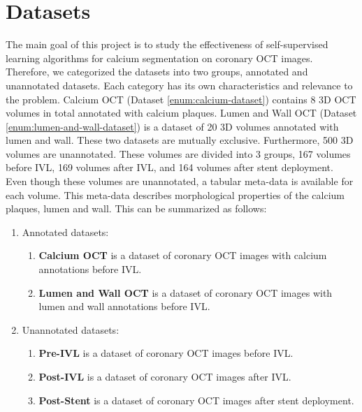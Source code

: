\documentclass[a4paper,11pt,oneside]{report}
\begin{document}

\section{Datasets}\label{sec:design:datasets}
The main goal of this project is to study the effectiveness of self-supervised learning algorithms for calcium segmentation on coronary OCT images. Therefore, we categorized the datasets into two groups, annotated and unannotated datasets. Each category has its own characteristics and relevance to the problem. Calcium OCT (Dataset \ref{enum:calcium-dataset}) contains 8 3D OCT volumes in total annotated with calcium plaques. Lumen and Wall OCT (Dataset \ref{enum:lumen-and-wall-dataset}) is a dataset of 20 3D volumes annotated with lumen and wall. These two datasets are mutually exclusive. Furthermore, 500 3D volumes are unannotated. These volumes are divided into 3 groups, 167 volumes before IVL, 169 volumes after IVL, and 164 volumes after stent deployment. Even though these volumes are unannotated, a tabular meta-data is available for each volume. This meta-data describes morphological properties of the calcium plaques, lumen and wall. This can be summarized as follows:

\begin{enumerate}
    \item Annotated datasets:
    \begin{enumerate}
        \item \label{enum:calcium-dataset} \textbf{Calcium OCT} is a dataset of coronary OCT images with calcium annotations before IVL.
        \item \label{enum:lumen-and-wall-dataset} \textbf{Lumen and Wall OCT} is a dataset of coronary OCT images with lumen and wall annotations before IVL.
    \end{enumerate}
    \item \label{enum:unannotated-dataset} Unannotated datasets:
    \begin{enumerate}
        \item \textbf{Pre-IVL} is a dataset of coronary OCT images before IVL.
        \item \textbf{Post-IVL} is a dataset of coronary OCT images after IVL.
        \item \textbf{Post-Stent} is a dataset of coronary OCT images after stent deployment.
    \end{enumerate}
\end{enumerate}
\end{document}
